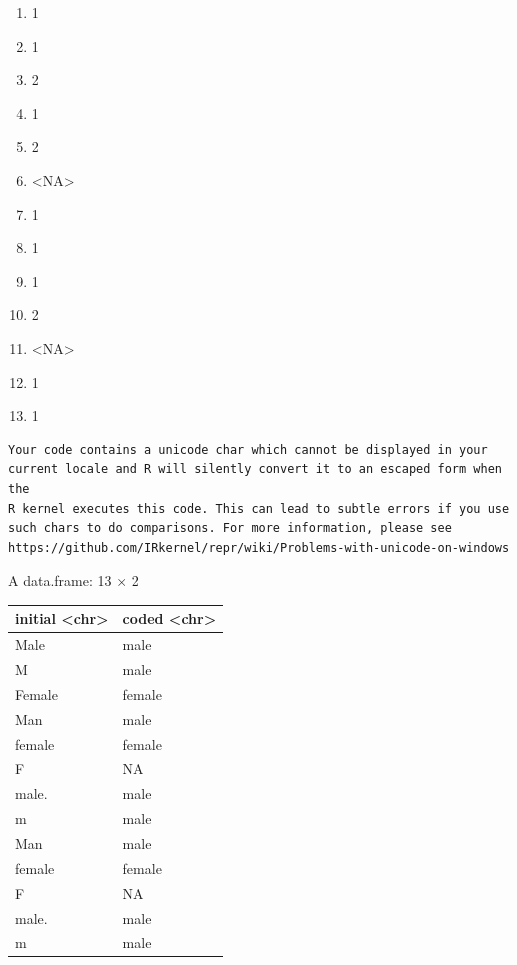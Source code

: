 \documentclass[
  letterpaper,
  DIV=11,
  numbers=noendperiod]{scrreprt}
\newenvironment{Shaded}{\begin{snugshade}}{\end{snugshade}}
\newcommand{\AttributeTok}[1]{\textcolor[rgb]{0.40,0.45,0.13}{#1}}
\newcommand{\CommentTok}[1]{\textcolor[rgb]{0.37,0.37,0.37}{#1}}
\newcommand{\FunctionTok}[1]{\textcolor[rgb]{0.28,0.35,0.67}{#1}}
\newcommand{\NormalTok}[1]{\textcolor[rgb]{0.00,0.23,0.31}{#1}}
\newcommand{\SpecialCharTok}[1]{\textcolor[rgb]{0.37,0.37,0.37}{#1}}
\providecommand{\tightlist}{%
  \setlength{\itemsep}{0pt}\setlength{\parskip}{0pt}}\usepackage{longtable,booktabs,array}
\begin{document}
\begin{enumerate}
\def\labelenumi{\arabic{enumi}.}
\tightlist
\item
  1
\item
  1
\item
  2
\item
  1
\item
  2
\item
  \textless NA\textgreater{}
\item
  1
\item
  1
\item
  1
\item
  2
\item
  \textless NA\textgreater{}
\item
  1
\item
  1
\end{enumerate}

\begin{Shaded}
\end{Shaded}

\begin{verbatim}
Your code contains a unicode char which cannot be displayed in your
current locale and R will silently convert it to an escaped form when the
R kernel executes this code. This can lead to subtle errors if you use
such chars to do comparisons. For more information, please see
https://github.com/IRkernel/repr/wiki/Problems-with-unicode-on-windows
\end{verbatim}

A data.frame: 13 × 2

\begin{longtable}[]{@{}ll@{}}
\toprule\noalign{}
initial \textless chr\textgreater{} & coded
\textless chr\textgreater{} \\
\midrule\noalign{}
\endhead
\bottomrule\noalign{}
\endlastfoot
Male & male \\
M & male \\
Female & female \\
Man & male \\
female & female \\
F & NA \\
male. & male \\
m & male \\
Man & male \\
female & female \\
F & NA \\
male. & male \\
m & male \\
\end{longtable}
\end{document}

